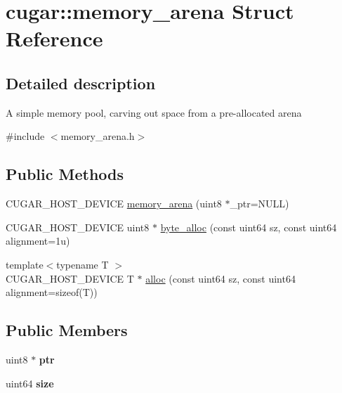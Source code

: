\hypertarget{structcugar_1_1memory__arena}{}\section{cugar\+:\+:memory\+\_\+arena Struct Reference}
\label{structcugar_1_1memory__arena}


\subsection{Detailed description}
A simple memory pool, carving out space from a pre-\/allocated arena 

{\ttfamily \#include $<$memory\+\_\+arena.\+h$>$}

\subsection*{Public Methods}
\begin{DoxyCompactItemize}
\item 
C\+U\+G\+A\+R\+\_\+\+H\+O\+S\+T\+\_\+\+D\+E\+V\+I\+CE \hyperlink{structcugar_1_1memory__arena_a45eb7c6eccc45c97658c841b4cf7380a}{memory\+\_\+arena} (uint8 $\ast$\+\_\+ptr=N\+U\+LL)
\item 
C\+U\+G\+A\+R\+\_\+\+H\+O\+S\+T\+\_\+\+D\+E\+V\+I\+CE uint8 $\ast$ \hyperlink{structcugar_1_1memory__arena_a8c3be4a3e7e2ccd71e044263fa3302d8}{byte\+\_\+alloc} (const uint64 sz, const uint64 alignment=1u)
\item 
{\footnotesize template$<$typename T $>$ }\\C\+U\+G\+A\+R\+\_\+\+H\+O\+S\+T\+\_\+\+D\+E\+V\+I\+CE T $\ast$ \hyperlink{structcugar_1_1memory__arena_afcbc6673ae3fa3e61368495ed2041621}{alloc} (const uint64 sz, const uint64 alignment=sizeof(T))
\end{DoxyCompactItemize}
\subsection*{Public Members}
\begin{DoxyCompactItemize}
\item 
\mbox{\label{structcugar_1_1memory__arena_a503c9731f981510adc9b5ad18f7cf903}} 
uint8 $\ast$ {\bfseries ptr}
\item 
\mbox{\label{structcugar_1_1memory__arena_aeb81e2bc41df3ae065af94637063b9b4}} 
uint64 {\bfseries size}
\end{DoxyCompactItemize}


